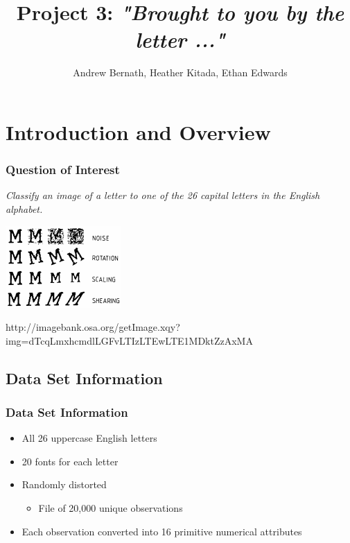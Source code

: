 \documentclass{beamer}
\title{Project 3: \emph{"Brought to you by the letter ..."} }
\author{Andrew Bernath, Heather Kitada, Ethan Edwards}
\institute{Oregon State University}
\begin{document}
\begin{frame}
\titlepage
\end{frame}



\begin{frame}{\contentsname}
\begin{multicols}{2}
\tableofcontents
\end{multicols}
\end{frame}

\section{Introduction and Overview}
\begin{frame}
\frametitle{Question of Interest}
\large{\emph{Classify an image of a letter to one of the 26 capital letters in the English alphabet.}}

\begin{center} 
\includegraphics[width=.6 \textwidth]{letterDistortion}

\tiny{http://imagebank.osa.org/getImage.xqy?img=dTcqLmxhcmdlLGFvLTIzLTEwLTE1MDktZzAxMA}
\end{center}
\end{frame}

\subsection{Data Set Information}
\begin{frame}
\frametitle{Data Set Information}
\begin{itemize}
\item All 26 uppercase English letters 
\item 20 fonts for each letter 
\item Randomly distorted 
\begin{itemize}
\item File of 20,000 unique observations
\end{itemize}
\item Each observation converted into 16 primitive numerical attributes 
\end{itemize}
\end{frame}
\end{document}
